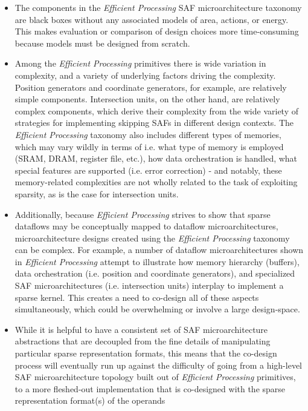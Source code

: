 \begin{itemize}
    \item The components in the \textit{Efficient Processing} SAF microarchitecture taxonomy are black boxes without any associated models of area, actions, or energy. This makes evaluation or comparison of design choices more time-consuming because models must be designed from scratch.
    \item Among the \textit{Efficient Processing} primitives there is wide variation in complexity, and a variety of underlying factors driving the complexity. Position generators and coordinate generators, for example, are relatively simple components. Intersection units, on the other hand, are relatively complex components, which derive their complexity from the wide variety of strategies for implementing skipping SAFs in different design contexts. The \textit{Efficient Processing} taxonomy also includes different types of memories, which may vary wildly in terms of i.e. what type of memory is employed (SRAM, DRAM, register file, etc.), how data orchestration is handled, what special features are supported (i.e. error correction) - and notably, these memory-related complexities are not wholly related to the task of exploiting sparsity, as is the case for intersection units.
    \item Additionally, because \textit{Efficient Processing} strives to show that sparse dataflows may be conceptually mapped to dataflow microarchitectures\cite{szebook}, microarchitecture designs created using the \textit{Efficient Processing} taxonomy can be complex. For example, a number of dataflow microarchitectures shown in \textit{Efficient Processing} attempt to illustrate how memory hierarchy (buffers), data orchestration (i.e. position and coordinate generators), and specialized SAF microarchitectures (i.e. intersection units) interplay to implement a sparse kernel\cite{szebook}. This creates a need to co-design all of these aspects simultaneously, which could be overwhelming or involve a large design-space.
    
    \item While it is helpful to have a consistent set of SAF microarchitecture abstractions that are decoupled from the fine details of manipulating particular sparse representation formats, this means that the co-design process will eventually run up against the difficulty of going from a high-level SAF microarchitecture topology built out of \textit{Efficient Processing} primitives, to a more fleshed-out implementation that is co-designed with the sparse representation format(s) of the operands
    
\end{itemize}

